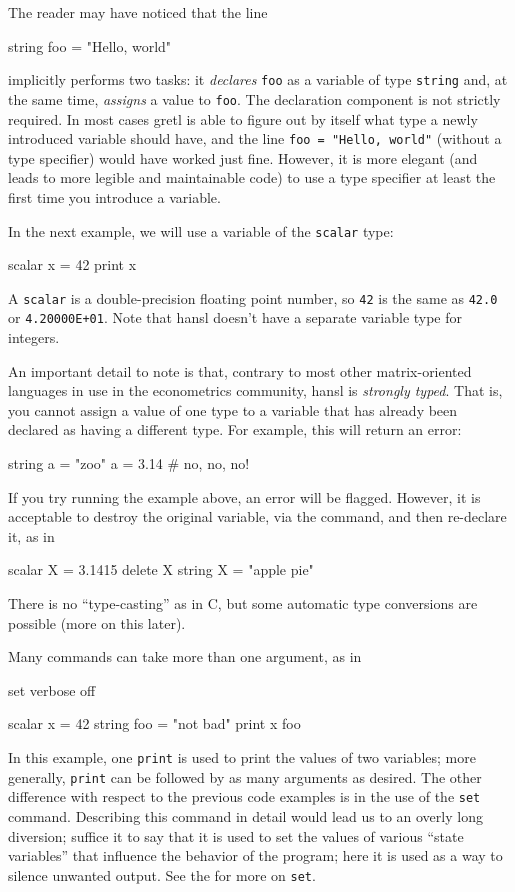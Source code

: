The reader may have noticed that the line 
\begin{code}
  string foo = "Hello, world"
\end{code}
implicitly performs two tasks: it \emph{declares} \texttt{foo} as a
variable of type \texttt{string} and, at the same time, \emph{assigns}
a value to \texttt{foo}. The declaration component is not strictly
required. In most cases gretl is able to figure out by itself what
type a newly introduced variable should have, and the line
\verb|foo = "Hello, world"| (without a type specifier) would have
worked just fine.  However, it is more elegant (and leads to more
legible and maintainable code) to use a type specifier at least the
first time you introduce a variable.
  
In the next example, we will use a variable of the \texttt{scalar}
type:
\begin{code}
  scalar x = 42
  print x
\end{code}
A \texttt{scalar} is a double-precision floating point number, so
\texttt{42} is the same as \texttt{42.0} or \texttt{4.20000E+01}. Note
that hansl doesn't have a separate variable type for integers.

An important detail to note is that, contrary to most other
matrix-oriented languages in use in the econometrics community, hansl
is \emph{strongly typed}. That is, you cannot assign a value of one
type to a variable that has already been declared as having a
different type. For example, this will return an error:
\begin{code}
  string a = "zoo"
  a = 3.14 # no, no, no!
\end{code}
If you try running the example above, an error will be
flagged. However, it is acceptable to destroy the original variable,
via the  command, and then re-declare it, as in
\begin{code}
  scalar X = 3.1415
  delete X
  string X = "apple pie"
\end{code}

There is no ``type-casting'' as in C, but some automatic type
conversions are possible (more on this later).

Many commands can take more than one argument, as in
\begin{code}
  set verbose off

  scalar x = 42
  string foo = "not bad"
  print x foo 
\end{code}
In this example, one \texttt{print} is used to print the values of two
variables; more generally, \texttt{print} can be followed by as many
arguments as desired. The other difference with respect to the
previous code examples is in the use of the \texttt{set}
command. Describing this command in detail would lead us to an overly
long diversion; suffice it to say that it is used to set the values of
various ``state variables'' that influence the behavior of the
program; here it is used as a way to silence unwanted output. See the
\GCR{} for more on \texttt{set}.

